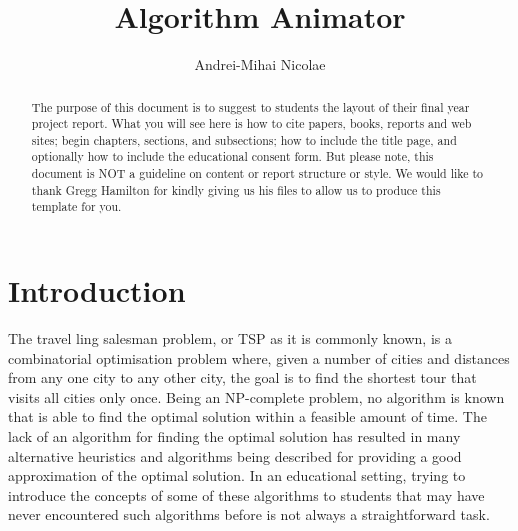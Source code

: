 \documentclass{l4proj}
\begin{document}
\title{Algorithm Animator}
\author{Andrei-Mihai Nicolae}
\maketitle

\begin{abstract}
The purpose of this document is to suggest to students the layout of their final year project report. What
you will see here is how to cite papers, books, reports and web sites; begin chapters, sections, and subsections; how
to include the title page, and optionally how to include the educational consent form. But please note,
this document is NOT a guideline on content or report structure or style. We would like to thank Gregg Hamilton for kindly giving us 
his files to allow us to produce this template for you.
\end{abstract}

\educationalconsent

\tableofcontents
\chapter{Introduction}
\label{intro}
The travel ling salesman problem, or TSP as it is commonly known, is a combinatorial optimisation problem where, given a number of cities and 
distances from any one city to any other city, the goal is to find the shortest tour that visits all cities only once. Being an NP-complete 
problem, no algorithm is known that is able to find the optimal solution within a feasible amount of time. The lack of an algorithm for finding 
the optimal solution has resulted in many alternative heuristics and algorithms being described for providing a good approximation of the optimal 
solution. In an educational setting, trying to introduce the concepts of some of these algorithms to students that may have never encountered 
such algorithms before is not always a straightforward task.
\end{document}
